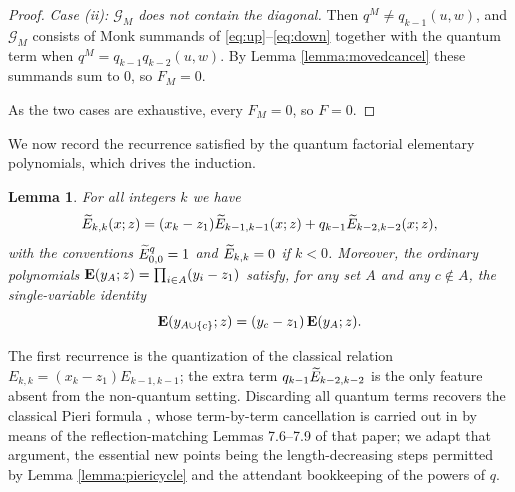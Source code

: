 \documentclass{amsart}
\newtheorem{lemma}{Lemma}[section]
\theoremstyle{definition}
\theoremstyle{remark}
\numberwithin{equation}{section}
\begin{document}
\begin{proof}
\emph{Case (ii): $\mathcal{G}_M$ does not contain the diagonal.} Then $q^M\neq q_{k-1}(u,w)$, and $\mathcal{G}_M$ consists of Monk summands of \eqref{eq:up}--\eqref{eq:down} together with the quantum term when $q^M=q_{k-1}q_{k-2}(u,w)$. By Lemma \ref{lemma:movedcancel} these summands sum to $0$, so $F_M=0$.

As the two cases are exhaustive, every $F_M=0$, so $F=0$.
\end{proof}

We now record the recurrence satisfied by the quantum factorial elementary polynomials, which drives the induction.

\begin{lemma} \label{lemma:elemrecursion}
For all integers $k$ we have
$$\widetilde{E}_{k,k}(x;z)=(x_k-z_1)\widetilde{E}_{k-1,k-1}(x;z)+q_{k-1}\widetilde{E}_{k-2,k-2}(x;z),$$
with the conventions $\widetilde{E}_{0,0}^q=1$ and $\widetilde{E}_{k,k}=0$ if $k<0$. Moreover, the ordinary polynomials $\mathbf{E}(y_A;z)=\prod_{i\in A}(y_i-z_1)$ satisfy, for any set $A$ and any $c\notin A$, the single-variable identity
$$\mathbf{E}(y_{A\cup\{c\}};z)=(y_c-z_1)\,\mathbf{E}(y_A;z).$$
\end{lemma}

The first recurrence is the quantization of the classical relation $E_{k,k}=(x_k-z_1)E_{k-1,k-1}$; the extra term $q_{k-1}\widetilde{E}_{k-2,k-2}$ is the only feature absent from the non-quantum setting. Discarding all quantum terms recovers the classical Pieri formula \cite[Theorem~7.1]{samuelmolev}, whose term-by-term cancellation is carried out in \cite[Proof of Proposition~4.4]{samuelmolev} by means of the reflection-matching Lemmas 7.6--7.9 of that paper; we adapt that argument, the essential new points being the length-decreasing steps permitted by Lemma \ref{lemma:piericycle} and the attendant bookkeeping of the powers of $q$.
\end{document}
